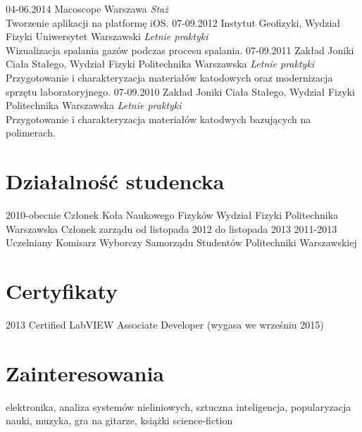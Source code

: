 \documentclass[]{friggeri-cv} %
\begin{document}
\begin{entrylist}
\entry
	{04-06.2014}
	{Macoscope}
	{Warszawa}
	{
		\emph{Staż} \\
		Tworzenie aplikacji na platformę iOS.
	}
\entry
	{07-09.2012}
	{Instytut Geofizyki, {\normalfont Wydział Fizyki}}
	{Uniwersytet Warszawski}
	{
		\emph{Letnie praktyki} \\
		Wizualizacja spalania gazów podczas procesu spalania.	
	}
\entry
	{07-09.2011}
	{Zakład Joniki Ciała Stałego, {\normalfont Wydział Fizyki}}
	{Politechnika Warszawska}
	{
		\emph{Letnie praktyki} \\
		Przygotowanie i charakteryzacja materiałów katodowych oraz modernizacja sprzętu laboratoryjnego.
	}
\entry
	{07-09.2010}
	{Zakład Joniki Ciała Stałego, {\normalfont Wydział Fizyki}}
	{Politechnika Warszawska}
	{
		\emph{Letnie praktyki} \\
		Przygotowanie i charakteryzacja materiałów katodwych bazujących na polimerach.	
	}
\end{entrylist}

\section{Działalność studencka}

\begin{entrylist}
	\entry
		{2010-obecnie}
 		{Członek Koła Naukowego Fizyków}
 		{Wydział Fizyki Politechnika Warszawska}
 		{Członek zarządu od listopada 2012 do listopada 2013}
 	\entry
		{2011-2013}
 		{Uczelniany Komisarz Wyborczy Samorządu Studentów Politechniki Warszawskiej}
 		{}
 		{}
\end{entrylist}

\section{Certyfikaty}
\begin{entrylist}
	\entry
		{2013}
 		{Certified LabVIEW Associate Developer {\normalfont(wygasa we wrześniu 2015)}}
 		{}
 		{}
\end{entrylist}

\section{Zainteresowania}

elektronika, analiza systemów nieliniowych, sztuczna inteligencja, popularyzacja nauki, muzyka, gra na gitarze, książki science-fiction
\end{document}
